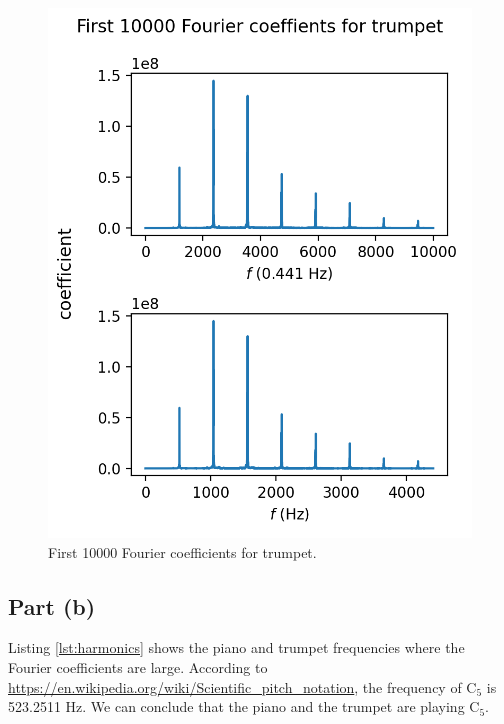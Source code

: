 \documentclass[11pt]{article}
\begin{document}
\begin{figure}[H]
    \centering
    \includegraphics[scale = 0.68]{images/ps-8-2FTt.png}
    \caption{First 10000 Fourier coefficients for trumpet.}
    \label{fig:FTt}
\end{figure}

\subsection{Part (b)}
Listing \ref{lst:harmonics} shows the piano and trumpet frequencies where the Fourier coefficients are large. According to \url{https://en.wikipedia.org/wiki/Scientific_pitch_notation}, the frequency of $\mathrm{C}_5$ is 523.2511 Hz. We can conclude that the piano and the trumpet are playing $\mathrm{C}_5$.

\end{document}
